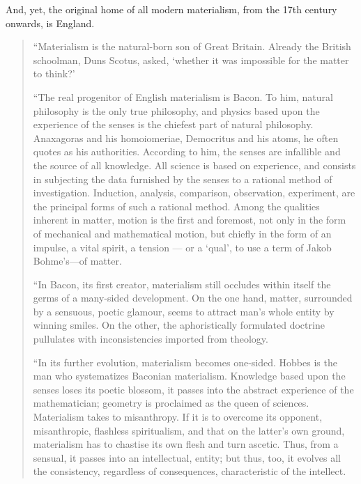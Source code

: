 And, yet, the original home of all modern materialism, from the 17th century
onwards, is England.
%
\begin{quote}
  ``Materialism is the natural-born son of Great Britain. Already the British
  schoolman, Duns Scotus, asked, `whether it was impossible for the matter to
  think?'

  ``The real progenitor of English materialism is Bacon. To him, natural
  philosophy is the only true philosophy, and physics based upon the
  experience of the senses is the chiefest part of natural philosophy.
  Anaxagoras and his homoiomeriae, Democritus and his atoms, he often quotes
  as his authorities. According to him, the senses are infallible and the
  source of all knowledge. All science is based on experience, and consists in
  subjecting the data furnished by the senses to a rational method of
  investigation. Induction, analysis, comparison, observation, experiment, are
  the principal forms of such a rational method. Among the qualities inherent
  in matter, motion is the first and foremost, not only in the form of
  mechanical and mathematical motion, but chiefly in the form of an impulse, a
  vital spirit, a tension — or a `qual', to use a term of Jakob Bohme's---of matter.

  ``In Bacon, its first creator, materialism still occludes within itself the
  germs of a many-sided development. On the one hand, matter, surrounded by a
  sensuous, poetic glamour, seems to attract man's whole entity by winning
  smiles. On the other, the aphoristically formulated doctrine pullulates with
  inconsistencies imported from theology.

  ``In its further evolution, materialism becomes one-sided. Hobbes is the man
  who systematizes Baconian materialism. Knowledge based upon the senses loses
  its poetic blossom, it passes into the abstract experience of the
  mathematician; geometry is proclaimed as the queen of sciences. Materialism
  takes to misanthropy. If it is to overcome its opponent, misanthropic,
  flashless spiritualism, and that on the latter's own ground, materialism has
  to chastise its own flesh and turn ascetic. Thus, from a sensual, it passes
  into an intellectual, entity; but thus, too, it evolves all the consistency,
  regardless of consequences, characteristic of the intellect.


\end{quote}
